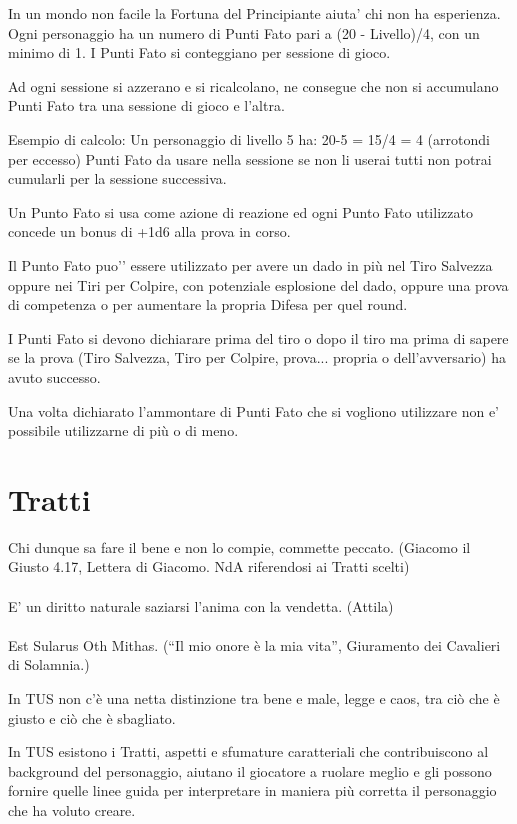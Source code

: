 \documentclass[a4paper,11pt,twoside,openany]{book}
\begin{document}
In un mondo non facile la Fortuna del Principiante aiuta’ chi non ha esperienza.
Ogni personaggio ha un numero di Punti Fato pari a (20 - Livello)/4, con un minimo di 1. I Punti Fato si conteggiano per sessione di gioco.

Ad ogni sessione si azzerano e si ricalcolano, ne consegue che non si accumulano Punti Fato tra una sessione di gioco e l’altra.

Esempio di calcolo:
Un personaggio di livello 5 ha: 20-5 = 15/4 = 4 (arrotondi per eccesso) Punti Fato da usare nella sessione se non li userai tutti non potrai cumularli per la sessione successiva.

Un Punto Fato si usa come azione di reazione ed ogni Punto Fato utilizzato concede un bonus di +1d6 alla prova in corso.

Il Punto Fato puo'’ essere utilizzato per avere un dado in più nel Tiro Salvezza oppure nei Tiri per Colpire, con potenziale esplosione del dado, oppure una prova di competenza o per aumentare la propria Difesa per quel round.

I Punti Fato si devono dichiarare prima del tiro o dopo il tiro ma prima di sapere se la prova (Tiro Salvezza, Tiro per Colpire, prova... propria o dell’avversario) ha avuto successo.

Una volta dichiarato l’ammontare di Punti Fato che si vogliono utilizzare non e’ possibile utilizzarne di più o di meno.

\section{Tratti}

\label{tratti}
\begin{tcolorbox}[enhanced,arc=5pt,boxrule=0.3pt]{Chi dunque sa fare il bene e non lo compie, commette peccato. (Giacomo il Giusto 4.17, Lettera di Giacomo. NdA riferendosi ai Tratti scelti)\\\\
E' un diritto naturale saziarsi l'anima con la vendetta. (Attila)\\\\
Est Sularus Oth Mithas. (“Il mio onore è la mia vita”, Giuramento dei Cavalieri di Solamnia.)}\end{tcolorbox}\medskip

In TUS non c'è una netta distinzione tra bene e male, legge e caos, tra ciò che è giusto e ciò che è sbagliato.

In TUS esistono i Tratti, aspetti e sfumature caratteriali che contribuiscono al background del personaggio, aiutano il giocatore a ruolare meglio e gli possono fornire quelle linee guida per interpretare in maniera più corretta il personaggio che ha voluto creare.
\end{document}
